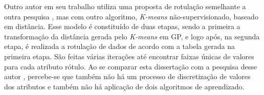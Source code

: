 Outro autor   em seu trabalho utiliza uma proposta de rotulação semelhante a outra pesquisa , mas com outro algoritmo, \textit{K-means} não-supervisionado, baseado em distância. Esse modelo é constituído de duas etapas, sendo a primeira a transformação da distância gerada pelo \textit{K-means} em GP, e logo após, na segunda etapa, é realizada a rotulação de dados de acordo com a tabela gerada na primeira etapa. São feitas várias iterações até encontrar faixas únicas de valores para cada atributo rótulo. Ao se comparar esta dissertação com a pesquisa desse autor \cite{Imperes2018a}, percebe-se que também não há um processo de discretização de valores dos atributos e também não há aplicação de dois algoritmos de aprendizado. 


